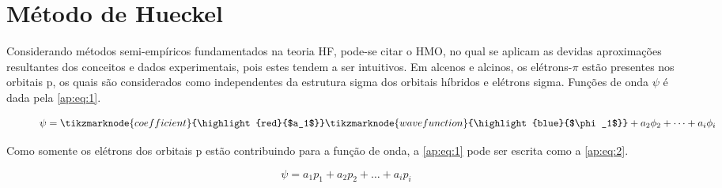 \chapter{Método de Hueckel}

Considerando métodos semi-empíricos fundamentados na teoria \gls{HF}, pode-se citar o \gls{HMO}, no qual se aplicam as devidas aproximações resultantes dos conceitos e dados experimentais, pois estes tendem a ser intuitivos. Em alcenos e alcinos, os elétrons-$\pi$ estão presentes nos orbitais p, os quais são considerados como independentes da estrutura sigma dos orbitais híbridos e elétrons sigma. Funções de onda $\psi$ é dada pela \autoref{ap:eq:1}.

\begin{figure}[htb]
    \vspace{2\baselineskip}
\begin{equation}
    \label{ap:eq:1}
    \psi = \tikzmarknode{coefficient}{\highlight{red}{$a_1$}} \tikzmarknode{wavefunction}{\highlight{blue}{$\phi_1$}} + a_2\phi_2 + \dots + a_i \phi_i
\end{equation}
\end{figure}

Como somente os elétrons dos orbitais p estão contribuindo para a função de onda, a \autoref{ap:eq:1} pode ser escrita como a \autoref{ap:eq:2}.

\begin{figure}[htb]
    \vspace{2\baselineskip}
\begin{equation}
    \label{ap:eq:2}
    \psi = a_1 p_1 + a_2 p_2 + \dots + a_i p_i
\end{equation}
\end{figure}

